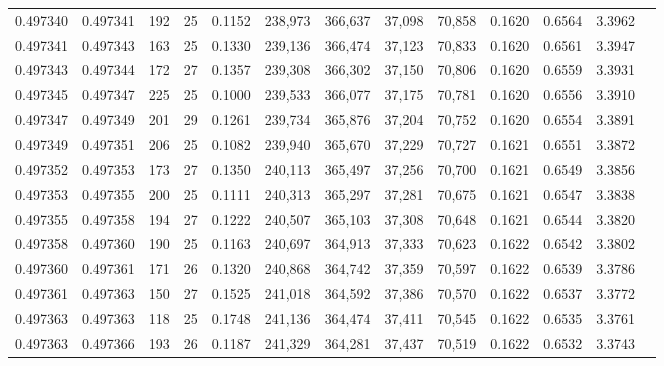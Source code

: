 \begin{tabular}{rrrrrrrrrrrrr}
0.497340 & 0.497341 & 192 &  25 &                                     0.1152 & 238,973 & 366,637 &  37,098 &  70,858 & 0.1620 & 0.6564 & 3.3962 \\
0.497341 & 0.497343 & 163 &  25 &                                     0.1330 & 239,136 & 366,474 &  37,123 &  70,833 & 0.1620 & 0.6561 & 3.3947 \\
0.497343 & 0.497344 & 172 &  27 &                                     0.1357 & 239,308 & 366,302 &  37,150 &  70,806 & 0.1620 & 0.6559 & 3.3931 \\
0.497345 & 0.497347 & 225 &  25 &                                     0.1000 & 239,533 & 366,077 &  37,175 &  70,781 & 0.1620 & 0.6556 & 3.3910 \\
0.497347 & 0.497349 & 201 &  29 &                                     0.1261 & 239,734 & 365,876 &  37,204 &  70,752 & 0.1620 & 0.6554 & 3.3891 \\
0.497349 & 0.497351 & 206 &  25 &                                     0.1082 & 239,940 & 365,670 &  37,229 &  70,727 & 0.1621 & 0.6551 & 3.3872 \\
0.497352 & 0.497353 & 173 &  27 &                                     0.1350 & 240,113 & 365,497 &  37,256 &  70,700 & 0.1621 & 0.6549 & 3.3856 \\
0.497353 & 0.497355 & 200 &  25 &                                     0.1111 & 240,313 & 365,297 &  37,281 &  70,675 & 0.1621 & 0.6547 & 3.3838 \\
0.497355 & 0.497358 & 194 &  27 &                                     0.1222 & 240,507 & 365,103 &  37,308 &  70,648 & 0.1621 & 0.6544 & 3.3820 \\
0.497358 & 0.497360 & 190 &  25 &                                     0.1163 & 240,697 & 364,913 &  37,333 &  70,623 & 0.1622 & 0.6542 & 3.3802 \\
0.497360 & 0.497361 & 171 &  26 &                                     0.1320 & 240,868 & 364,742 &  37,359 &  70,597 & 0.1622 & 0.6539 & 3.3786 \\
0.497361 & 0.497363 & 150 &  27 &                                     0.1525 & 241,018 & 364,592 &  37,386 &  70,570 & 0.1622 & 0.6537 & 3.3772 \\
0.497363 & 0.497363 & 118 &  25 &                                     0.1748 & 241,136 & 364,474 &  37,411 &  70,545 & 0.1622 & 0.6535 & 3.3761 \\
0.497363 & 0.497366 & 193 &  26 &                                     0.1187 & 241,329 & 364,281 &  37,437 &  70,519 & 0.1622 & 0.6532 & 3.3743 \\

\end{tabular}
